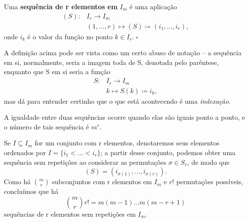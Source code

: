 \documentclass[../differential_forms.tex]{subfiles}
\begin{document}
\begin{def*}
	Uma \textbf{sequência de r elementos em }\(I_{m}\) é uma aplicação
	\begin{align*}
		(S): & I_{r}\rightarrow I_{m}                                     \\
		     & (1,\dotsc ,r)\longmapsto (S)\coloneqq (i_1, \dotsc , i_r),
	\end{align*}
	onde \(i_{k}\) é o valor da função no ponto \(k\in I_{r}.\; \square\)
\end{def*}
\begin{tcolorbox}[
		skin=enhanced,
		title=Observação,
		fonttitle=\bfseries,
		colframe=black,
		colbacktitle=cyan!75!white,
		colback=cyan!15,
		colbacklower=black,
		coltitle=black,
		drop fuzzy shadow,
	]
	A definição acima pode ser vista como um certo abuso de notação -- a sequência em si, normalmente, seria a imagem toda de S, denotada pelo parêntese, enquanto que S em si seria a função
	\begin{align*}
		S: & I_r\rightarrow I_{m}               \\
		   & k\longmapsto S(k) \coloneqq i_{k},
	\end{align*}
	mas dá para entender certinho que o que está acontecendo é uma \textit{indexação}.
\end{tcolorbox}
A igualdade entre duas sequências ocorre quando elas são iguais ponto a ponto, e o número de tais sequência é \(m^{r}.\)

Se \(I\subseteq I_{m}\) for um conjunto com r elementos, denotaremos seus elementos ordenados por \(I=\{i_1 <\dotsc <i_r\}\); a partir desse conjunto, podemos obter uma sequência sem repetições ao considerar as permutações \(\sigma \in S_r\), de modo que
\[
	(S) = (i_{\sigma (1)}, \dotsc , i_{\sigma (r)}).
\]
Como há \(\binom{m}{r}\) subconjuntos com r elementos em \(I_{m}\) e \(r!\) permutações possíveis, concluímos que há
\[
	\binom{m}{r}r! = m(m-1)\dotsc m(m-r+1)
\]
sequências de r elementos sem repetições em \(I_{m}.\)
\end{document}
